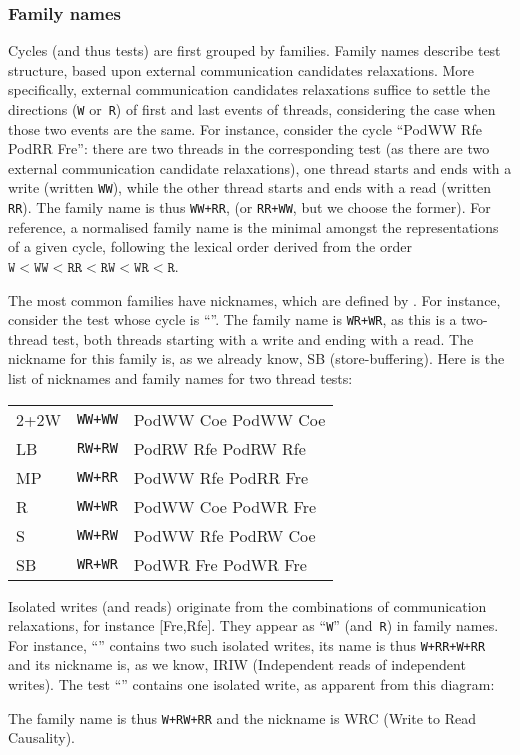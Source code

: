 \subsubsection{Family names}
Cycles (and thus tests) are first grouped by families.
Family names describe test structure,
based upon external communication candidates relaxations.
More specifically, external communication candidates relaxations
suffice to settle the directions (\texttt{W} or~\texttt{R}) of
first and last events of threads,
considering the case when those two events are the same.
For instance, consider the cycle ``PodWW Rfe PodRR Fre'':
there are two threads
in the corresponding test (as there are two external communication candidate
relaxations), one thread starts and ends with a write (written \texttt{WW}),
while the other thread starts and ends with a read (written \texttt{RR}).
The family name is thus
\texttt{WW+RR}, (or \texttt{RR+WW}, but we choose the former).
For reference, a normalised family name is the minimal
amongst the representations of a given cycle, following the lexical order
derived from the order
$\texttt{W} < \texttt{WW} <
\texttt{RR} < \texttt{RW} < \texttt{WR} < \texttt{R}$.

The most common families have nicknames, which are defined
by .
For instance, consider the test whose cycle is
``''.
The family name is \texttt{WR+WR}, as
this is a two-thread test, both threads starting with
a write and ending with a read.
The nickname for this family is, as we already know, SB (store-buffering).
Here is the list of nicknames and family names for two thread tests:
\begin{center}
\begin{tabular}{ll|l}
\hline
2+2W & \texttt{WW+WW} & PodWW Coe PodWW Coe \\
LB  & \texttt{RW+RW} & PodRW Rfe PodRW Rfe \\
MP & \texttt{WW+RR} & PodWW Rfe PodRR Fre \\
R & \texttt{WW+WR} & PodWW Coe PodWR Fre \\
S & \texttt{WW+RW} & PodWW Rfe PodRW Coe \\
SB & \texttt{WR+WR} & PodWR Fre PodWR Fre \\
\hline
\end{tabular}
\end{center}

Isolated writes (and reads) originate from the combinations of
communication relaxations,
for instance [Fre,Rfe].
They appear as ``\texttt{W}'' (and~\texttt{R}) in family names.
For instance,  ``''
contains two such isolated
writes, its name is thus \texttt{W+RR+W+RR} and its nickname is,
as we know, IRIW (Independent reads of independent writes).
The test ``''
contains one isolated write, as apparent from
this diagram:
\begin{center}\end{center}
The family name is thus \texttt{W+RW+RR} and the nickname is
WRC (Write to Read Causality).


